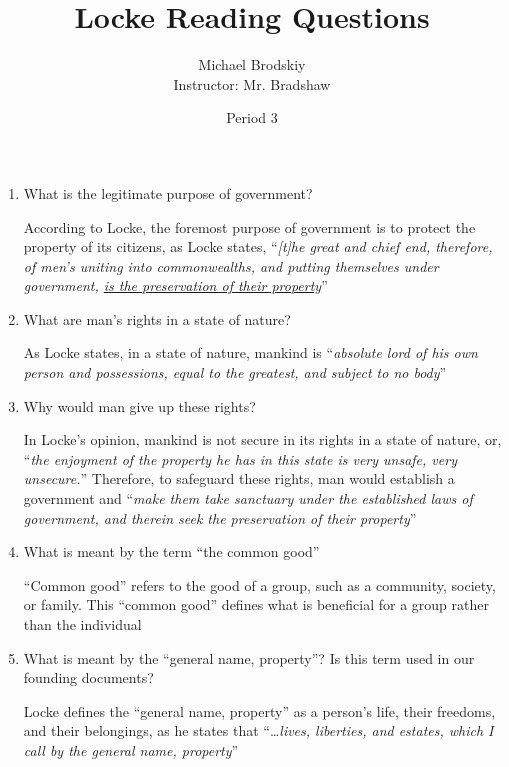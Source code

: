 \documentclass[12pt]{article}
\title{Locke Reading Questions}
\date{Period 3}
\author{Michael Brodskiy\\ \small Instructor: Mr. Bradshaw}
\begin{document}
\maketitle

\begin{enumerate}

  \item What is the legitimate purpose of government?

    \begin{justify}
      According to Locke, the foremost purpose of government is to protect the property of its citizens, as Locke states, “\textit{[t]he great and chief end, therefore, of men's uniting into commonwealths, and putting themselves under government, \underline{is the preservation of their property}}”
    \end{justify}

  \item What are man's rights in a state of nature?

    \begin{justify}
      As Locke states, in a state of nature, mankind is “\textit{absolute lord of his own person and possessions, equal to the greatest, and subject to no body}”
    \end{justify}

  \item Why would man give up these rights?

    \begin{justify}
      In Locke's opinion, mankind is not secure in its rights in a state of nature, or, “\textit{the enjoyment of the property he has in this state is very unsafe, very unsecure.}” Therefore, to safeguard these rights, man would establish a government and “\textit{make them take sanctuary under the established laws of government, and therein seek the preservation of their property}”
    \end{justify}

  \item What is meant by the term “the common good”

    \begin{justify}
      “Common good” refers to the good of a group, such as a community, society, or family. This “common good” defines what is beneficial for a group rather than the individual
    \end{justify}

  \item What is meant by the “general name, property”? Is this term used in our founding documents?

    \begin{justify}
      Locke defines the “general name, property” as a person's life, their freedoms, and their belongings, as he states that “\dots\textit{lives, liberties, and estates, which I call by the general name, property}”
    \end{justify}

\end{enumerate}
\end{document}
